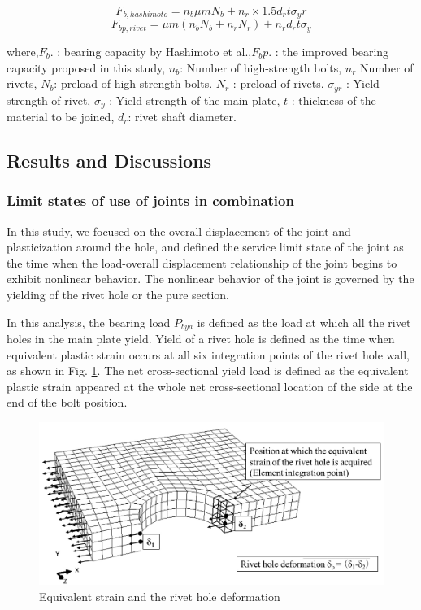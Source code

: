 \begin{equation}\label{eq-fbhashi}
    F_{b,hashimoto}=n_b μmN_b + n_r \times 1.5d_r tσ_yr
\end{equation}
\begin{equation}
    F_{bp,rivet}=μm(n_b N_b+n_r N_r)+n_r d_r tσ_y
\end{equation}

where,$F_b.$ : bearing capacity by Hashimoto et al.,$F_bp$. : the improved bearing capacity proposed in this study, $n_b$: Number of high-strength bolts, $n_r$ Number of rivets, $N_b$: preload of high strength bolts. $N_r$ : preload of rivets. $\sigma_{yr}$ : Yield strength of rivet, $σ_y$ : Yield strength of the main plate, $t$ : thickness of the material to be joined, $d_r$: rivet shaft diameter.

\subsection{Results and Discussions}

\subsubsection{Limit states of use of joints in combination}

In this study, we focused on the overall displacement of the joint and plasticization around the hole, and defined the service limit state of the joint as the time when the load-overall displacement relationship of the joint begins to exhibit nonlinear behavior. The nonlinear behavior of the joint is governed by the yielding of the rivet hole or the pure section.

In this analysis, the bearing load $P_{bya}$ is defined as the load at which all the rivet holes in the main plate yield. Yield of a rivet hole is defined as the time when equivalent plastic strain occurs at all six integration points of the rivet hole wall, as shown in Fig. \ref{fig-posieqqe}. \ac{The net cross-sectional yield load} is defined as the equivalent plastic strain appeared at the whole net cross-sectional location of the side at the end of the bolt position.

\begin{figure}[htbp]
    \centering
    \includegraphics[width=0.75\linewidth]{imgs//ch4/posi-eqqe.pdf}
    \caption{Equivalent strain and the rivet hole deformation}
    \label{fig-posieqqe}
\end{figure}


